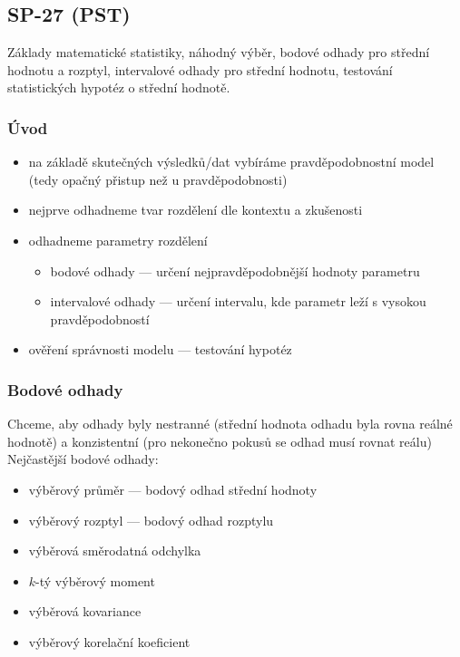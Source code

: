 \subsection{SP-27 (PST)}
Základy matematické statistiky, náhodný výběr, bodové odhady pro střední hodnotu a rozptyl, intervalové odhady pro střední hodnotu, testování statistických hypotéz o střední hodnotě.

\subsubsection*{Úvod}
\begin{itemize}
	\item na základě skutečných výsledků/dat vybíráme pravděpodobnostní model (tedy opačný přistup než u pravděpodobnosti)
	\item nejprve odhadneme tvar rozdělení dle kontextu a zkušenosti
	\item odhadneme parametry rozdělení
	\begin{itemize}
		\item bodové odhady --- určení nejpravděpodobnější hodnoty parametru
		\item intervalové odhady --- určení intervalu, kde parametr leží s vysokou pravděpodobností
	\end{itemize}
	\item ověření správnosti modelu --- testování hypotéz
\end{itemize}

\subsubsection*{Bodové odhady}
Chceme, aby odhady byly nestranné (střední hodnota odhadu byla rovna reálné hodnotě) a konzistentní (pro nekonečno pokusů se odhad musí rovnat reálu)
Nejčastější bodové odhady:
\begin{itemize}
	\item výběrový průměr --- bodový odhad střední hodnoty
	\item výběrový rozptyl --- bodový odhad rozptylu
	\item výběrová směrodatná odchylka
	\item $k$-tý výběrový moment
	\item výběrová kovariance
	\item výběrový korelační koeficient
\end{itemize}

